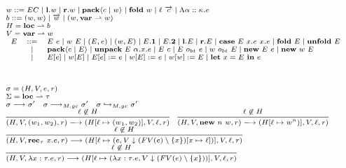 \documentclass[fleqn]{article}
\begin{document}
\[
\scriptsize
\begin{array}{l}
	w ::= EC \mid \mathbf{l}.w \mid \mathbf{r}.w \mid \mathbf{pack} \langle c \mid w \rangle \mid \mathbf{fold}~w \mid \ell~\overrightarrow{c} \mid \Lambda \alpha :: \kappa. e \\
	b ::= (w,w) \mid \overrightarrow{w} \mid (w, \mathbf{var} \rightharpoonup w) \\
	H = \mathbf{loc} \rightharpoonup b \\
	V = \mathbf{var} \rightharpoonup w \\
	\begin{array}{lcl}
	E & ::=&  E~e \mid w~E \mid (E,e) \mid (w,E) \mid E.\mathbf{1} \mid E.\mathbf{2} \mid \mathbf{l}.E \mid \mathbf{r}.E \mid \mathbf{case}~E~x.e~x.e \mid \mathbf{fold}~E \mid \mathbf{unfold}~E \\
	& \mid & \mathbf{pack}\langle c \mid E \rangle \mid \mathbf{unpack}~E~\alpha.x.e \mid E~c \mid E~o_{bt}~e \mid w~o_{bt}~E \mid \mathbf{new}~E~e \mid \mathbf{new}~w~E \\
	& \mid & E[e] \mid w[E] \mid E[e] := e \mid w[E] := e \mid w[w] := E \mid \mathbf{let}~x=E~\mathbf{in}~e
	\end{array} \\
	\\
	\\
	\\
	\sigma = (H, V, e, r) \\
	\Sigma = \mathbf{loc} \rightharpoonup \tau \\
	\sigma \longrightarrow \sigma' \hspace{1em} \sigma \longrightarrow_{M,gc} \sigma' \hspace{1em} \sigma \hookrightarrow_{M,gc} \sigma' \\
	\infer{(H,V,(w_1,w_2),r) \longrightarrow (H[\ell \mapsto (w_1,w_2)],V,\ell,r)}{\ell \not\in H} \hspace{1em}
	\infer{(H,V,\mathbf{new}~n~w,r) \longrightarrow (H[\ell \mapsto w^n)],V,\ell,r)}{\ell \not\in H} \\
	\infer{(H,V,\mathbf{rec}_\tau~x.e,r) \longrightarrow (H[\ell \mapsto (e,V \downarrow (FV(e) \setminus \{x\})[x \mapsto \ell])], V, \ell ,r)}{\ell \not\in H} \\
	\infer{(H,V,\lambda x:\tau. e,r) \longrightarrow (H[\ell \mapsto (\lambda x : \tau. e, V \downarrow (FV(e) \setminus \{x\}))],V,\ell,r)}{\ell \not\in H} \\
	\\
	\\
	\\

\end{array}\]
\end{document}
